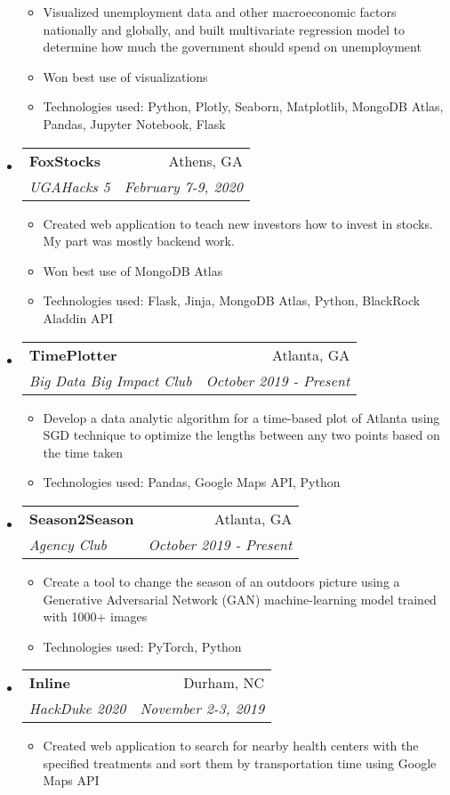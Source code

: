 \documentclass[letterpaper,11pt]{article}
\makeatletter
\newcommand{\resitem}[1]{\item #1 \vspace{-2pt}}
\newcommand{\ressubheading}[4]{
\begin{tabular*}{7.0in}{l@{\extracolsep{\fill}}r}
		\textbf{#1} & #2 \\
		\textit{#3} & \textit{#4} \\
\end{tabular*}\vspace{-6pt}}
\makeatother
\begin{document}
\begin{itemize}
    \begin{itemize}
        \resitem{Visualized unemployment data and other macroeconomic factors nationally and globally, and built multivariate regression model to determine how much the government should spend on unemployment}
        \resitem{Won best use of visualizations}
        \resitem{Technologies used: Python, Plotly, Seaborn, Matplotlib, MongoDB Atlas, Pandas, Jupyter Notebook, Flask}
    \end{itemize}
\item
    \ressubheading{FoxStocks}{Athens, GA}{UGAHacks 5}{February 7-9, 2020}
    \begin{itemize}
        \item Created web application to teach new investors how to invest in stocks. My part was mostly backend work. 
        \item Won best use of MongoDB Atlas
        \item Technologies used: Flask, Jinja, MongoDB Atlas, Python, BlackRock Aladdin API
    \end{itemize}
\item
    \ressubheading{TimePlotter}{Atlanta, GA}{Big Data Big Impact Club}{October 2019 - Present}
    \begin{itemize}
        \item Develop a data analytic algorithm for a time-based plot of Atlanta using SGD technique to optimize the lengths between any two points based on the time taken
        \item Technologies used: Pandas, Google Maps API, Python
    \end{itemize}
\item
    \ressubheading{Season2Season}{Atlanta, GA}{Agency Club}{October 2019 - Present}
    \begin{itemize}
        \item Create a tool to change the season of an outdoors picture using a Generative Adversarial Network (GAN) machine-learning model trained with 1000+ images
        \item Technologies used: PyTorch, Python
    \end{itemize}
\item
    \ressubheading{Inline}{Durham, NC}{HackDuke 2020}{November 2-3, 2019}
    \begin{itemize}
        \item Created web application to search for nearby health centers with the specified treatments and sort them by transportation time using Google Maps API

\end{itemize}
\end{itemize}
\end{document}
